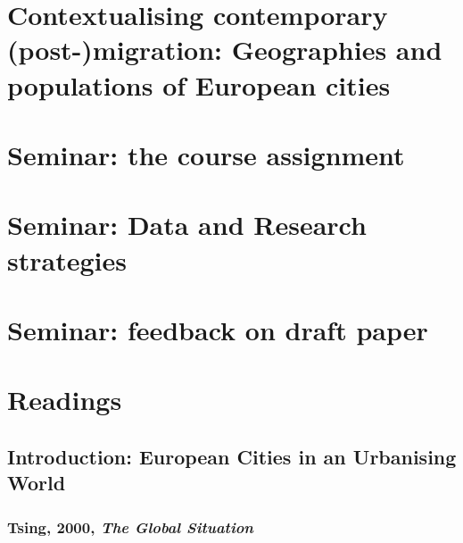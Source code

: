 \documentclass{article}
\begin{document}

\section{Contextualising contemporary (post-)migration: Geographies and populations of European cities}
\date{November 29th, 2021}


\section{Seminar: the course assignment}
\date{October 11th, 2021}


\section{Seminar: Data and Research strategies}
\date{October 26th, 2021}




\section{Seminar: feedback on draft paper}
\date{December 13th, 2021}


\section{Readings}

\subsection{Introduction: European Cities in an Urbanising World}

\subsubsection{Tsing, 2000, \textit{The Global Situation}}
\end{document}
